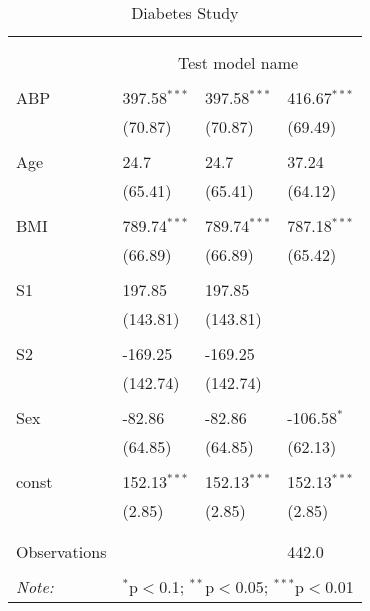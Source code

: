 \begin{table}[!htbp] \centering
  \caption{Diabetes Study}
  \label{}
\begin{tabularx}{\textwidth}{lXXX}
\\[-1.8ex]\hline
\hline \\[-1.8ex]
& \multicolumn{3}{c}{\textit{}} \
\cr \cline{3-4}
\\[-1.8ex] & \multicolumn{3}{c}{Test model name} \\\hline \\[-1.8ex]
 ABP & 397.58$^{***}$ & 397.58$^{***}$ & 416.67$^{***}$ \\
  & (70.87) & (70.87) & (69.49) \\
  & & & \\
 Age & 24.7$^{}$ & 24.7$^{}$ & 37.24$^{}$ \\
  & (65.41) & (65.41) & (64.12) \\
  & & & \\
 BMI & 789.74$^{***}$ & 789.74$^{***}$ & 787.18$^{***}$ \\
  & (66.89) & (66.89) & (65.42) \\
  & & & \\
 S1 & 197.85$^{}$ & 197.85$^{}$ & \\
  & (143.81) & (143.81) & \\
  & & & \\
 S2 & -169.25$^{}$ & -169.25$^{}$ & \\
  & (142.74) & (142.74) & \\
  & & & \\
 Sex & -82.86$^{}$ & -82.86$^{}$ & -106.58$^{*}$ \\
  & (64.85) & (64.85) & (62.13) \\
  & & & \\
 const & 152.13$^{***}$ & 152.13$^{***}$ & 152.13$^{***}$ \\
  & (2.85) & (2.85) & (2.85) \\
  & & & \\
\hline \\[-1.8ex]
 Observations &   &   & 442.0 \\
\hline
\hline \\[-1.8ex]
\textit{Note:} & \multicolumn{3}{r}{$^{*}$p$<$0.1; $^{**}$p$<$0.05; $^{***}$p$<$0.01} \\
\end{tabularx}
\end{table}